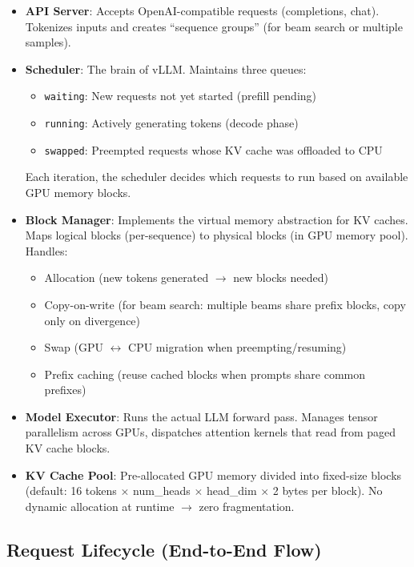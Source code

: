 \begin{itemize}
  \item \textbf{API Server}: Accepts OpenAI-compatible requests (completions, chat). Tokenizes inputs and creates ``sequence groups'' (for beam search or multiple samples).
  \item \textbf{Scheduler}: The brain of vLLM. Maintains three queues:

\begin{itemize}
  \item \texttt{waiting}: New requests not yet started (prefill pending)
  \item \texttt{running}: Actively generating tokens (decode phase)
  \item \texttt{swapped}: Preempted requests whose KV cache was offloaded to CPU
\end{itemize}

Each iteration, the scheduler decides which requests to run based on available GPU memory blocks.
  \item \textbf{Block Manager}: Implements the virtual memory abstraction for KV caches. Maps logical blocks (per-sequence) to physical blocks (in GPU memory pool). Handles:

\begin{itemize}
  \item Allocation (new tokens generated $\rightarrow$ new blocks needed)
  \item Copy-on-write (for beam search: multiple beams share prefix blocks, copy only on divergence)
  \item Swap (GPU $\leftrightarrow$ CPU migration when preempting/resuming)
  \item Prefix caching (reuse cached blocks when prompts share common prefixes)
\end{itemize}
  \item \textbf{Model Executor}: Runs the actual LLM forward pass. Manages tensor parallelism across GPUs, dispatches attention kernels that read from paged KV cache blocks.
  \item \textbf{KV Cache Pool}: Pre-allocated GPU memory divided into fixed-size blocks (default: 16 tokens $\times$ num\_heads $\times$ head\_dim $\times$ 2 bytes per block). No dynamic allocation at runtime $\rightarrow$ zero fragmentation.
\end{itemize}

\subsection{Request Lifecycle (End-to-End Flow)}
\label{request-lifecycle-end-to-end-flow}

